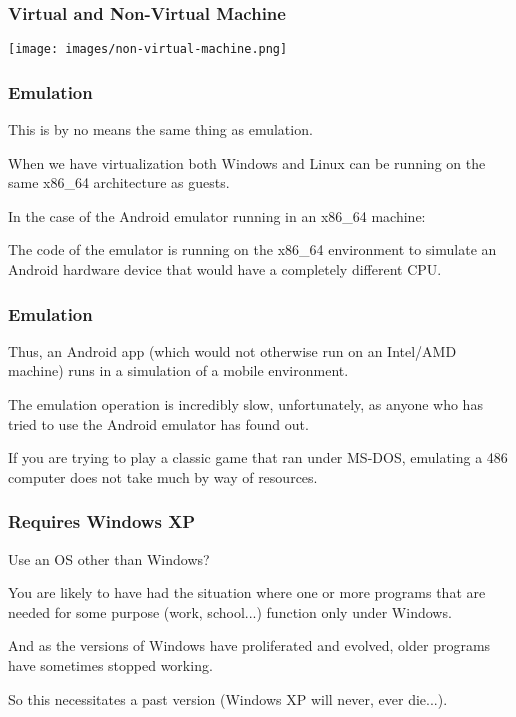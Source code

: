 \begin{frame}
\frametitle{Virtual and Non-Virtual Machine}

\begin{center}
	\texttt{[image: images/non-virtual-machine.png]}
\end{center}

\end{frame}

\begin{frame}
\frametitle{Emulation}

This is by no means the same thing as \alert{emulation}. 

When we have virtualization both Windows and Linux can be running on the same x86\_64 architecture as guests. 

In the case of the Android emulator running in an x86\_64 machine: 

The code of the emulator is running on the x86\_64 environment to simulate an Android hardware device that would have a completely different CPU. 

\end{frame}

\begin{frame}
\frametitle{Emulation}

Thus, an Android app (which would not otherwise run on an Intel/AMD machine) runs in a simulation of a mobile environment. 

The emulation operation is incredibly slow, unfortunately, as anyone who has tried to use the Android emulator has found out. 

If you are trying to play a classic game that ran under MS-DOS, emulating a 486 computer does not take much by way of resources.



\end{frame}

\begin{frame}
\frametitle{Requires Windows XP}

Use an OS other than Windows? 

You are likely to have had the situation where one or more programs that are needed for some purpose (work, school...) function only under Windows. 

And as the versions of Windows have proliferated and evolved, older programs have sometimes stopped working.

So this necessitates a past version (Windows XP will never, ever die...).

\end{frame}

